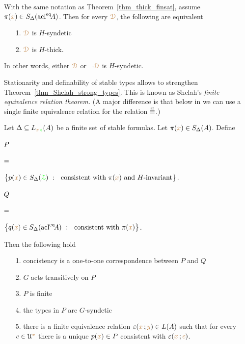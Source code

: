 \begin{corollary}
  With the same notation as Theorem~\ref{thm_thick_finsat}, assume $\pi({\color{brown} x})\in S_\Delta({\rm acl}^{{\rm eq}}\!A)$.
  Then for every ${\color{brown}\EuScript D}$, the following are equivalent
  \begin{itemize}
    \item[1.] ${\color{brown}\EuScript D}$ is $H$-syndetic
    \item[2.] ${\color{brown}\EuScript D}$ is $H$-thick.\smallskip
  \end{itemize}
  In other words, either ${\color{brown}\EuScript D}$ or $\neg{\color{brown}\EuScript D}$ is $H$-syndetic.
\end{corollary}

Stationarity and definability of stable types allows to strengthen Theorem~\ref{thm_Shelah_strong_types}.
This is known as Shelah's \textit{finite equivalence relation theorem.}
(A major difference is that below in  we can use a single finite equivalence relation for the relation $\equivSh$.)

\begin{theorem}\label{thm_FER}
  \def\medrel#1{\parbox[t]{5ex}{$\displaystyle\hfil #1$}}
  \def\ceq#1#2#3{\parbox[t]{6ex}{$\displaystyle #1$}\medrel{#2}{$\displaystyle #3$}}
  Let $\Delta\subseteq L_{{\color{brown} x}\,{\color{green} z}}(A)$ be a finite set of stable formulas.
  Let $\pi({\color{brown} x})\in S_\Delta(A)$.
  Define\smallskip

  \ceq{\hfill P}{=}{\big\{p({\mr x})\in S_\Delta(\grZ)\ :\ \textrm{ consistent with }\pi({\mr x})\textrm{ and }H\text{-invariant}\big\}}.\medskip

  \ceq{\hfill Q}{=}{\big\{q({\mr x})\in S_\Delta(\acl^\eq\!A)\ :\  \textrm{ consistent with }\pi({\mr x})\big\}}.\medskip
  
  Then the following hold
  \begin{itemize}
    \item [1.] concistency is a one-to-one correspondence between $P$ and $Q$
    \item [2.] $G$ acts transitively on $P$
    \item [3.] $P$ is finite
    \item [4.] the types in $P$ are $G$-syndetic
    \item [5.] there is a finite equivalence relation $\varepsilon({\color{brown} x}\,;{\color{brown} y})\in L(A)$ such that for every $c\in\EuScript U^{\color{brown} x}$ there is a unique $p({\color{brown} x})\in P$ consistent with $\varepsilon({\color{brown} x}\,;{\color{brown} c})$.
  \end{itemize}
\end{theorem}

